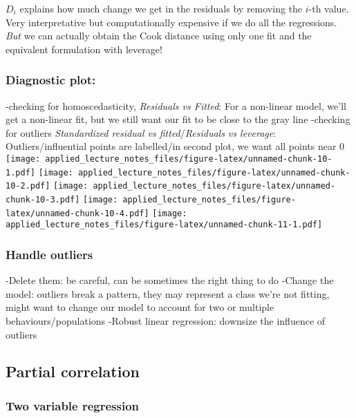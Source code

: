 \documentclass[
]{article}
\begin{document}
\(D_i\) explains how much change we get in the residuals by removing the
\(i\)-th value. Very interpretative but computationally expensive if we
do all the regressions. \emph{But} we can actually obtain the Cook
distance using only one fit and the equivalent formulation with
leverage!

\hypertarget{diagnostic-plot}{%
\subsubsection{Diagnostic plot:}\label{diagnostic-plot}}

-checking for homoscedasticity, \emph{Residuals vs Fitted}: For a
non-linear model, we'll get a non-linear fit, but we still want our fit
to be close to the gray line -checking for outliers \emph{Standardized
residual vs fitted}/\emph{Residuals vs leverage}: Outliers/influential
points are labelled/in second plot, we want all points near 0
\texttt{[image: applied\_lecture\_notes\_files/figure-latex/unnamed-chunk-10-1.pdf]}
\texttt{[image: applied\_lecture\_notes\_files/figure-latex/unnamed-chunk-10-2.pdf]}
\texttt{[image: applied\_lecture\_notes\_files/figure-latex/unnamed-chunk-10-3.pdf]}
\texttt{[image: applied\_lecture\_notes\_files/figure-latex/unnamed-chunk-10-4.pdf]}
\texttt{[image: applied\_lecture\_notes\_files/figure-latex/unnamed-chunk-11-1.pdf]}

\hypertarget{handle-outliers}{%
\subsubsection{Handle outliers}\label{handle-outliers}}

-Delete them: be careful, can be sometimes the right thing to do -Change
the model: outliers break a pattern, they may represent a class we're
not fitting, might want to change our model to account for two or
multiple behaviours/populations -Robust linear regression: downsize the
influence of outliers

\hypertarget{partial-correlation}{%
\subsection{Partial correlation}\label{partial-correlation}}

\hypertarget{two-variable-regression}{%
\subsubsection{Two variable regression}\label{two-variable-regression}}
\end{document}
